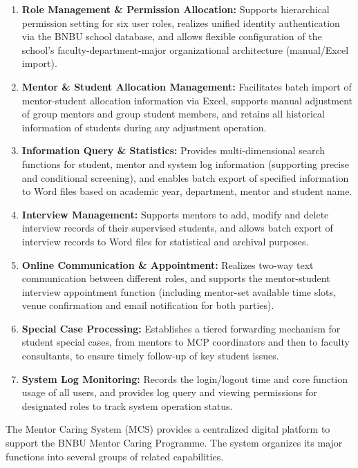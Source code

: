\begin{enumerate}
\item \textbf{Role Management \& Permission Allocation:} Supports hierarchical permission setting for six user roles, realizes unified identity authentication via the BNBU school database, and allows flexible configuration of the school's faculty-department-major organizational architecture (manual/Excel import).

\item \textbf{Mentor \& Student Allocation Management:} Facilitates batch import of mentor-student allocation information via Excel, supports manual adjustment of group mentors and group student members, and retains all historical information of students during any adjustment operation.

\item \textbf{Information Query \& Statistics:} Provides multi-dimensional search functions for student, mentor and system log information (supporting precise and conditional screening), and enables batch export of specified information to Word files based on academic year, department, mentor and student name.

\item \textbf{Interview Management:} Supports mentors to add, modify and delete interview records of their supervised students, and allows batch export of interview records to Word files for statistical and archival purposes.

\item \textbf{Online Communication \& Appointment:} Realizes two-way text communication between different roles, and supports the mentor-student interview appointment function (including mentor-set available time slots, venue confirmation and email notification for both parties).

\item \textbf{Special Case Processing:} Establishes a tiered forwarding mechanism for student special cases, from mentors to MCP coordinators and then to faculty consultants, to ensure timely follow-up of key student issues.

\item \textbf{System Log Monitoring:} Records the login/logout time and core function usage of all users, and provides log query and viewing permissions for designated roles to track system operation status.
\end{enumerate}

The Mentor Caring System (MCS) provides a centralized digital platform to support the BNBU Mentor Caring Programme. The system organizes its major functions into several groups of related capabilities.

